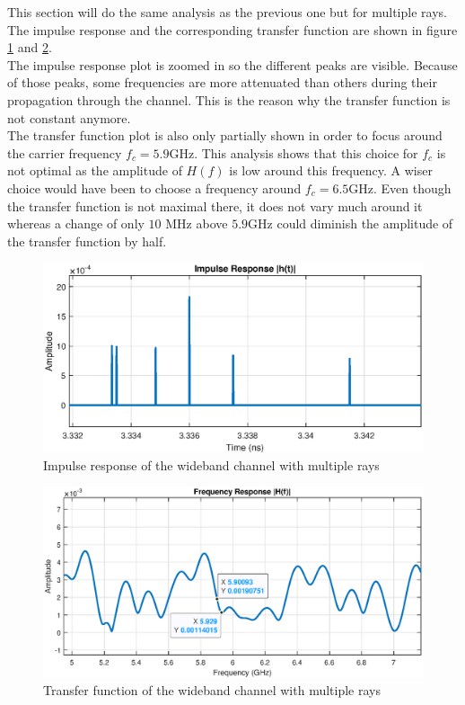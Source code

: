 \documentclass[10pt,a4paper]{ULBreport}
\begin{document}
This section will do the same analysis as the previous one but for multiple rays. The impulse response and the corresponding transfer function are shown in figure \ref{fig:impulse_response_full} and \ref{fig:transfer_function_full}. \\
The impulse response plot is zoomed in so the different peaks are visible. Because of those peaks, some frequencies are more attenuated than others during their propagation through the channel. This is the reason why the transfer function is not constant anymore. \\
The transfer function plot is also only partially shown in order to focus around the carrier frequency $f_c = 5.9$GHz. This analysis shows that this choice for $f_c$ is not optimal as the amplitude of $H(f)$ is low around this frequency. A wiser choice would have been to choose a frequency around $f_c = 6.5$GHz. Even though the transfer function is not maximal there, it does not vary much around it whereas a change of only $10$ MHz above $5.9$GHz could diminish the amplitude of the transfer function by half.

\begin{figure}[H]
    \centering
    \includegraphics[width=1\textwidth]{5_1.eps}
    \caption{Impulse response of the wideband channel with multiple rays}
    \label{fig:impulse_response_full}
\end{figure}

\begin{figure}[H]
    \centering
    \includegraphics[width=1\textwidth]{5_2.eps}
    \caption{Transfer function of the wideband channel with multiple rays}
    \label{fig:transfer_function_full}
\end{figure}
\end{document}
